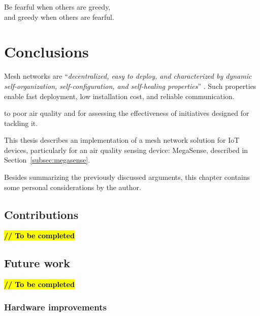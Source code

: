 
\begin{savequote}[70mm]
	Be fearful when others are greedy,\\
	and greedy when others are fearful.
\end{savequote}

\chapter{Conclusions}\label{chapter:conclusions}

	Mesh networks are ``\textit{decentralized, easy to deploy, and characterized by dynamic self-organization, self-configuration, and self-healing properties}'' \cite{Sampaio-2015}.
	Such properties enable fast deployment, low installation cost, and reliable communication.
	
	to poor air quality and for assessing the effectiveness of initiatives designed for tackling it.
	
	This thesis describes an implementation of a mesh network solution for IoT devices, particularly for an air quality sensing device: MegaSense, described in Section~\ref{subsec:megasense}.
	
%	
	
	Besides summarizing the previously discussed arguments, this chapter contains some personal considerations by the author.

	\section{Contributions}
	
		\textbf{\textcolor{red}{\hl{// To be completed}}}

	\section{Future work}
		
		\textbf{\textcolor{red}{\hl{// To be completed}}}
	
		\subsection{Hardware improvements}
			
